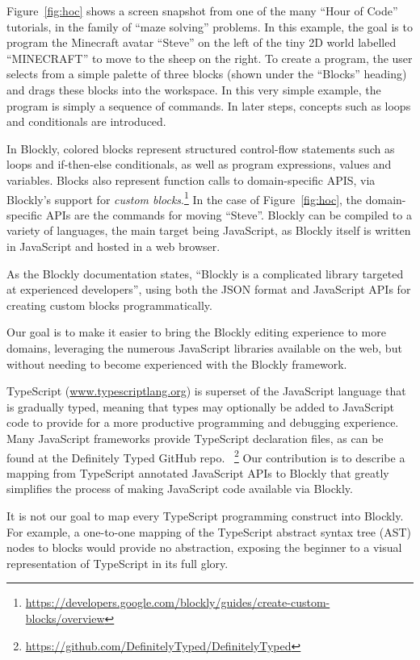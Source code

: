 Figure~\ref{fig:hoc} shows a screen snapshot from one of the many 
``Hour of Code'' tutorials, in the family of ``maze solving'' problems.
In this example, the goal is to program the Minecraft avatar ``Steve''
on the left of the tiny 2D world labelled ``MINECRAFT''
to move to the sheep on the right. To create a program,
the user selects from a simple palette of three blocks
(shown under the ``Blocks'' heading) and drags these blocks into
the workspace. In this very simple example, the
program is simply a sequence of commands. In later steps, 
concepts such as loops and conditionals are introduced.

In Blockly, colored blocks represent structured control-flow statements such as loops 
and if-then-else conditionals, as well as program expressions, values and variables. 
Blocks also represent function calls to domain-specific APIS, via Blockly's support 
for \emph{custom blocks}.\footnote{
\url{https://developers.google.com/blockly/guides/create-custom-blocks/overview}}
In the case of Figure~\ref{fig:hoc}, the domain-specific 
APIs are the commands for moving ``Steve''.
Blockly can be compiled to a variety of languages, the main target 
being JavaScript, as Blockly itself is written in JavaScript 
and hosted in a web browser.

As the Blockly documentation states, 
``Blockly is a complicated library targeted at experienced developers'',
using both the JSON format and JavaScript APIs for creating custom blocks
programmatically. 

Our goal is to make it easier to bring the Blockly editing experience to more
domains, leveraging the numerous JavaScript libraries available on the web, but
without needing to become experienced with the Blockly framework.

TypeScript (\url{www.typescriptlang.org}) is superset of the JavaScript language that is gradually typed, 
meaning that types may optionally be added to JavaScript code to provide for a more productive programming 
and debugging experience.  Many JavaScript frameworks provide TypeScript declaration files, as
can be found at the Definitely Typed GitHub repo.
~\footnote{\url{https://github.com/DefinitelyTyped/DefinitelyTyped}}
Our contribution is to describe a mapping from TypeScript annotated 
JavaScript APIs to Blockly that greatly simplifies 
the process of making JavaScript code available via Blockly.

It is not our goal to map every TypeScript programming construct into Blockly.
For example, a one-to-one mapping of the TypeScript abstract syntax tree (AST) 
nodes to blocks would provide no abstraction, exposing the beginner to a visual 
representation of TypeScript in its full glory.

